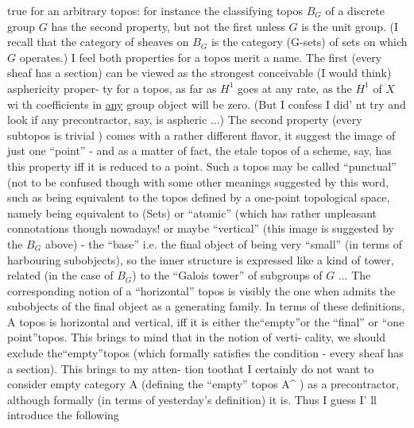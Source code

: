 
true for an arbitrary topos:  for instance the classifying topos $B_G$
of a discrete group $G$ has the second property, but not the first
 unless $G$ is the unit group. (I recall that the category of
sheaves on $B_G$ is the category  (G-sets)  of sets on which $G$ operates.)
I feel both properties for a topos merit a name.  The first 
(every sheaf has a section)  can be
viewed as the strongest conceivable (I would think)  asphericity proper-%
ty for a topos,  as far as $H^1$ goes at any rate,  as the $H^1$ of $X$  wi th
coefficients in \uline{any} group object will be zero.  (But I confess I did'
\margin{$<$} nt try and look if any precontractor,  say,  is aspheric ...) The
second property (every subtopos is  trivial ) comes with
a  rather different flavor, it suggest the image of just one
``point''  -  and as a matter of fact,  the etale topos of a scheme, say,
has this property iff it is reduced to a point.  Such a topos may be
called ``punctual'' (not to be confused though with some other meanings
suggested by this word,  such as being equivalent to the topos defined
by a one-point topological space,  namely  being equivalent to (Sets)\hand{)}
or ``atomic'' (which has rather unpleasant connotations though nowadays!\hand{),}
or maybe ``vertical'' (this image is suggested by the $B_G$ above) -  the
``base'' i.e. the final object of   being very ``small'' (in terms of
harbouring subobjects),  so the inner structure is expressed like a
kind of tower,  related (in the case of $B_G$)  to the ``Galois tower''
of subgroups of $G$ ...  The corresponding notion of a ``horizontal''
topos is visibly the one when   admits the subobjects of the final
object as a generating family.  In terms of these definitions,  A topos
is horizontal and vertical, iff it is either the``empty''or the ``final''
\hand{(}or ``one point''\hand{)}topos. This brings to mind that in the notion of verti-%
cality,  we should exclude the``empty''topos (which formally satisfies
the condition -  every sheaf has a section).  This brings to my atten-%
tion toothat I certainly do not want to consider  empty category
A  (defining  the ``empty'' topos A\^{} )  as a precontractor,  although
formally (in terms of yesterday's definition) it is.  Thus I guess I'
ll introduce the following

